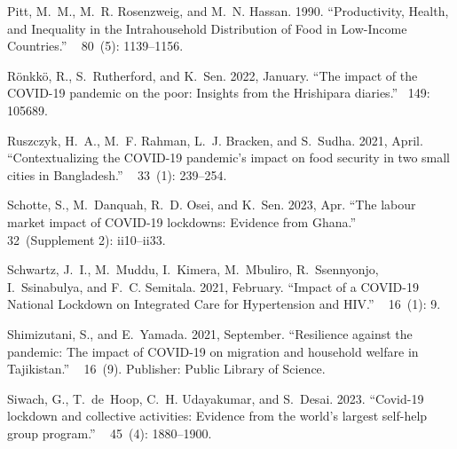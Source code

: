 \documentclass{wber}
\begin{document}
\begin{thebibliography}{}
Pitt, M.~M., M.~R. Rosenzweig, and M.~N. Hassan. 1990.
\newblock ``{Productivity, Health, and Inequality in the Intrahousehold
  Distribution of Food in Low-Income Countries}.''
~{ 80\/}~(5): 1139--1156.

R{\"o}nkk{\"o}, R., S.~Rutherford, and K.~Sen. 2022, January.
\newblock ``The impact of the {COVID}-19 pandemic on the poor: {Insights} from
  the {Hrishipara} diaries.''
~{149}: 105689.

Ruszczyk, H.~A., M.~F. Rahman, L.~J. Bracken, and S.~Sudha. 2021, April.
\newblock ``Contextualizing the {COVID}-19 pandemic's impact on food security
  in two small cities in {Bangladesh}.''
~{ 33\/}~(1): 239--254.

Schotte, S., M.~Danquah, R.~D. Osei, and K.~Sen. 2023, Apr.
\newblock ``The labour market impact of {COVID-19} lockdowns: Evidence from
  {Ghana}.''
~{ 32\/}~(Supplement 2):
  ii10--ii33.

Schwartz, J.~I., M.~Muddu, I.~Kimera, M.~Mbuliro, R.~Ssennyonjo, I.~Ssinabulya,
  and F.~C. Semitala. 2021, February.
\newblock ``Impact of a {COVID}-19 {National} {Lockdown} on {Integrated} {Care}
  for {Hypertension} and {HIV}.''
~{ 16\/}~(1): 9.

Shimizutani, S., and E.~Yamada. 2021, September.
\newblock ``Resilience against the pandemic: {The} impact of {COVID}-19 on
  migration and household welfare in {Tajikistan}.''
~{ 16\/}~(9).
\newblock Publisher: Public Library of Science.

Siwach, G., T.~de~Hoop, C.~H. Udayakumar, and S.~Desai. 2023.
\newblock ``Covid-19 lockdown and collective activities: Evidence from the
  world's largest self-help group program.''
~{ 45\/}~(4):
  1880--1900.


\end{thebibliography}
\end{document}
